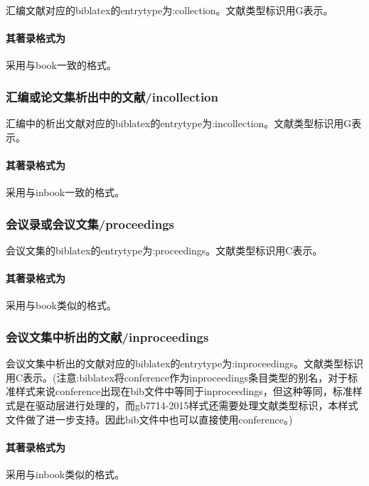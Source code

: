 \begin{refentry}{}{}
汇编文献对应的biblatex的entrytype为:collection。文献类型标识用G表示。

\paragraph{其著录格式为} 采用与book一致的格式。
\end{refentry}

\subsubsection{汇编或论文集析出中的文献/incollection}
\begin{refentry}{}{}
汇编中的析出文献对应的biblatex的entrytype为:incollection。文献类型标识用G表示。

\paragraph{其著录格式为} 采用与inbook一致的格式。
\end{refentry}

\subsubsection{会议录或会议文集/proceedings}
\begin{refentry}{}{}
会议文集的biblatex的entrytype为:proceedings。文献类型标识用C表示。

\paragraph{其著录格式为} 采用与book类似的格式。
\end{refentry}

\subsubsection{会议文集中析出的文献/inproceedings}
\begin{refentry}{}{}
会议文集中析出的文献对应的biblatex的entrytype为:inproceedings。文献类型标识用C表示。(注意:biblatex将conference作为inproceedings条目类型的别名，对于标准样式来说conference出现在bib文件中等同于inproceedings，但这种等同，标准样式是在驱动层进行处理的，而gb7714-2015样式还需要处理文献类型标识，本样式文件做了进一步支持。因此bib文件中也可以直接使用conference。)

\paragraph{其著录格式为} 采用与inbook类似的格式。
\end{refentry}


